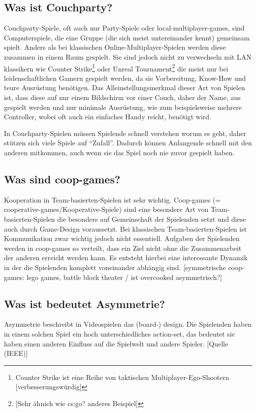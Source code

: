 \subsection{Was ist Couchparty?}

Couchparty-Spiele, oft auch nur Party-Spiele oder local-multiplayer-games, sind Computerspiele, die eine Gruppe (die sich meist untereinander kennt) gemeinsam spielt. Anders als bei klassischen Online-Multiplayer-Spielen werden diese zusammen in einem Raum gespielt. Sie sind jedoch nicht zu verwechseln mit LAN klassikern wie Counter Strike\footnote{Counter Strike ist eine Reihe von taktischen Multiplayer-Ego-Shootern [verbesserungswürdig]} oder Unreal Tournament\footnote{[Sehr ähnich wie cs:go? anderes Beispiel]} die meist nur bei leidenschaftlichen Gamern gespielt werden, da sie Vorbereitung, Know-How und teure Ausrüstung benötigen. Das Alleinstellungsmerkmal dieser Art von Spielen ist, dass diese auf nur einem Bildschirm vor einer Couch, daher der Name, aus gespielt werden und nur minimale Ausrüstung, wie zum beispielsweise mehrere Controller, wobei oft auch ein einfaches Handy reicht, benötigt wird.

In Couchparty-Spielen müssen Spielende schnell verstehen worum es geht, daher stützen sich viele Spiele auf "`Zufall"'. Dadurch können Anfangende schnell mit den anderen mitkommen, auch wenn sie das Spiel noch nie zuvor gespielt haben.

\subsection{Was sind coop-games?}

Kooperation in Team-basierten-Spielen ist sehr wichtig. Coop-games (= cooperative-games/Kooperative-Spiele) sind eine besondere Art von Team-basierten-Spielen die besonders auf Gemeinschaft der Spielenden setzt und diese auch durch Game-Design voraussetzt. Bei klassischen Team-basierten-Spielen ist Kommunikation zwar wichtig jedoch nicht essentiell. Aufgaben der Spielenden werden in coop-games so verteilt, dass ein Ziel nicht ohne die Zusammenarbeit der anderen erreicht werden kann. Es entsteht hierbei eine interessante Dynamik in der die Spielenden komplett voneinander abhängig sind. [symmetrische coop-games: lego games, battle block theater / ist overcooked asymmetrisch?]

\subsection{Was ist bedeutet Asymmetrie?}

Asymmetrie beschreibt in Videospielen das (board-) design. Die Spielenden haben in einem solchen Spiel ein hoch unterschiedliches action-set, das bedeutet sie haben einen anderen Einfluss auf die Spielwelt und andere Spieler. [Quelle (IEEE)] 